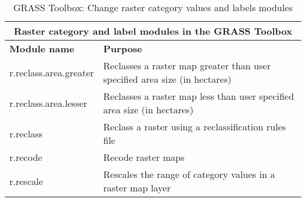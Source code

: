 \begin{table}[H]
\centering
 \begin{tabular}{|p{4cm}|p{10cm}|}
  \hline \multicolumn{2}{|c|}{\textbf{Raster category and label modules in the GRASS Toolbox}} \\
  \hline \textbf{Module name} & \textbf{Purpose} \\
  \hline r.reclass.area.greater & Reclasses a raster map greater than user
  specified area size (in hectares) \\
  \hline r.reclass.area.lesser & Reclasses a raster map less than user
  specified area size (in hectares) \\
  \hline r.reclass & Reclass a raster using a reclassification rules file \\
  \hline r.recode & Recode raster maps\\
  \hline r.rescale & Rescales the range of category values in a raster map
  layer \\
\hline
\end{tabular}
\caption{GRASS Toolbox: Change raster category values and labels modules}
\end{table}


